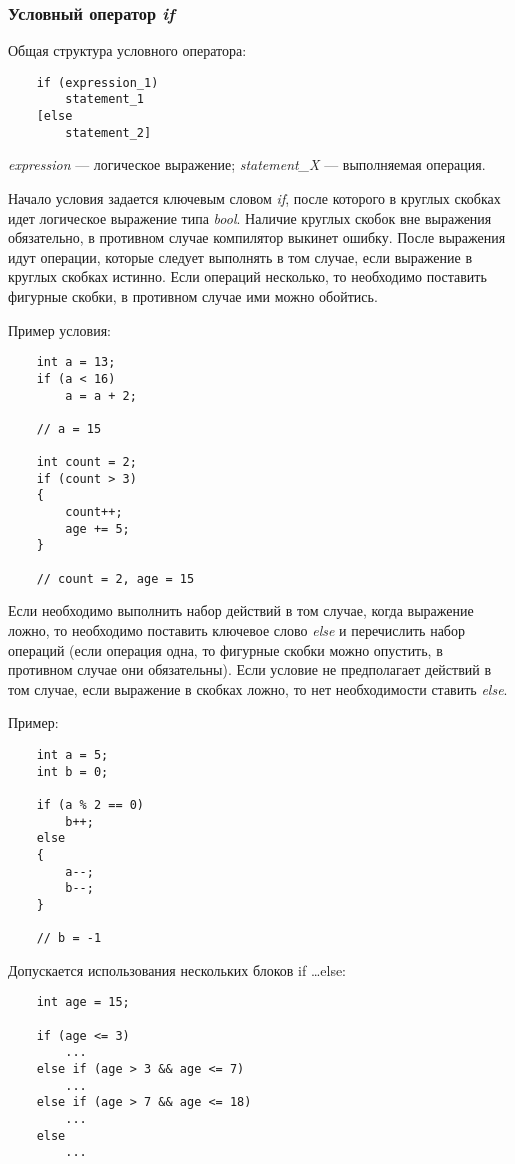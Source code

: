 \subsubsection{Условный оператор \textit{if}}
Общая структура условного оператора:
\begin{lstlisting}
    if (expression_1)
        statement_1
    [else
        statement_2]
\end{lstlisting}

\textit{expression} --- логическое выражение; \textit{statement\_X} --- выполняемая операция.

Начало условия задается ключевым словом \textit{if}, после которого в круглых скобках идет логическое выражение типа \textit{bool}. Наличие круглых скобок вне выражения обязательно, в противном случае компилятор выкинет ошибку. После выражения идут операции, которые следует выполнять в том случае, если выражение в круглых скобках истинно. Если операций несколько, то необходимо поставить фигурные скобки, в противном случае ими можно обойтись.

Пример условия:

\begin{lstlisting}
    int a = 13;
    if (a < 16)
        a = a + 2;

    // a = 15

    int count = 2;
    if (count > 3)
    {
        count++;
        age += 5;
    }

    // count = 2, age = 15
\end{lstlisting}

Если необходимо выполнить набор действий в том случае, когда выражение ложно, то необходимо поставить ключевое слово \textit{else} и перечислить набор операций (если операция одна, то фигурные скобки можно опустить, в противном случае они обязательны). Если условие не предполагает действий в том случае, если выражение в скобках ложно, то нет необходимости ставить \textit{else}.

Пример:
\begin{lstlisting}
    int a = 5;
    int b = 0;

    if (a % 2 == 0)
        b++;
    else
    {
        a--;
        b--;
    }

    // b = -1
\end{lstlisting}

Допускается использования нескольких блоков if \ldots else:

\begin{lstlisting}
    int age = 15;

    if (age <= 3)
        ...
    else if (age > 3 && age <= 7)
        ...
    else if (age > 7 && age <= 18)
        ...
    else
        ...
\end{lstlisting}

